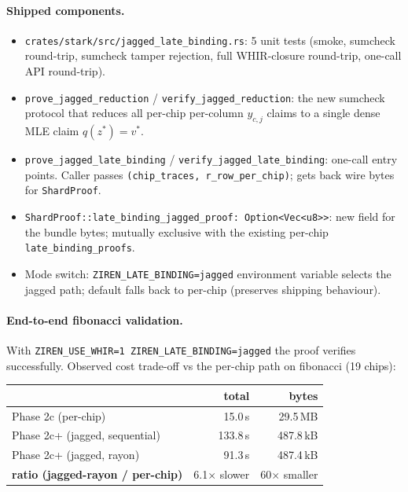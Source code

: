\paragraph{Shipped components.}
\begin{itemize}
  \item \texttt{crates/stark/src/jagged\_late\_binding.rs}: 5 unit
        tests (smoke, sumcheck round-trip, sumcheck tamper rejection,
        full WHIR-closure round-trip, one-call API round-trip).
  \item \texttt{prove\_jagged\_reduction} / \texttt{verify\_jagged\_reduction}:
        the new sumcheck protocol that reduces all per-chip per-column
        $y_{c,j}$ claims to a single dense MLE claim
        $q(z^*) = v^*$.
  \item \texttt{prove\_jagged\_late\_binding} / \texttt{verify\_jagged\_late\_binding}:
        one-call entry points.  Caller passes
        \texttt{(chip\_traces, r\_row\_per\_chip)}; gets back wire bytes
        for \texttt{ShardProof}.
  \item \texttt{ShardProof::late\_binding\_jagged\_proof:
        Option<Vec<u8>>}: new field for the bundle bytes; mutually
        exclusive with the existing per-chip \texttt{late\_binding\_proofs}.
  \item Mode switch: \texttt{ZIREN\_LATE\_BINDING=jagged}
        environment variable selects the jagged path; default falls
        back to per-chip (preserves shipping behaviour).
\end{itemize}

\paragraph{End-to-end fibonacci validation.}
With \texttt{ZIREN\_USE\_WHIR=1 ZIREN\_LATE\_BINDING=jagged} the proof
verifies successfully.  Observed cost trade-off vs the per-chip path
on fibonacci (19 chips):

\begin{tabular}{lrr}
\toprule
                                 & \textbf{total} & \textbf{bytes} \\
\midrule
Phase 2c (per-chip)              & 15.0\,s        & 29.5\,MB \\
Phase 2c+ (jagged, sequential)   & 133.8\,s       & 487.8\,kB \\
Phase 2c+ (jagged, rayon)        & 91.3\,s        & 487.4\,kB \\
\midrule
\textbf{ratio (jagged-rayon / per-chip)} & 6.1$\times$ slower & 60$\times$ smaller \\
\bottomrule
\end{tabular}


